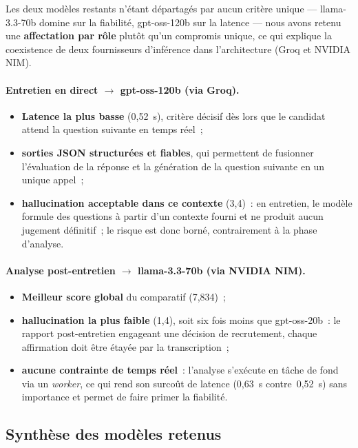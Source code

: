 Les deux modèles restants n'étant départagés par aucun critère unique --- llama-3.3-70b domine sur
la fiabilité, gpt-oss-120b sur la latence --- nous avons retenu une \textbf{affectation par rôle}
plutôt qu'un compromis unique, ce qui explique la coexistence de deux fournisseurs d'inférence dans
l'architecture (Groq et NVIDIA NIM).

\paragraph{Entretien en direct $\rightarrow$ gpt-oss-120b (via Groq).}
\begin{itemize}
  \item \textbf{Latence la plus basse} (0,52~s), critère décisif dès lors que le candidat attend la question suivante en temps réel~;
  \item \textbf{sorties JSON structurées et fiables}, qui permettent de fusionner l'évaluation de la réponse et la génération de la question suivante en un unique appel~;
  \item \textbf{hallucination acceptable dans ce contexte} (3,4)~: en entretien, le modèle formule des questions à partir d'un contexte fourni et ne produit aucun jugement définitif~; le risque est donc borné, contrairement à la phase d'analyse.
\end{itemize}

\paragraph{Analyse post-entretien $\rightarrow$ llama-3.3-70b (via NVIDIA NIM).}
\begin{itemize}
  \item \textbf{Meilleur score global} du comparatif (7,834)~;
  \item \textbf{hallucination la plus faible} (1,4), soit six fois moins que gpt-oss-20b~: le rapport post-entretien engageant une décision de recrutement, chaque affirmation doit être étayée par la transcription~;
  \item \textbf{aucune contrainte de temps réel}~: l'analyse s'exécute en tâche de fond via un \textit{worker}, ce qui rend son surcoût de latence (0,63~s contre~0,52~s) sans importance et permet de faire primer la fiabilité.
\end{itemize}

\subsection{Synthèse des modèles retenus}

